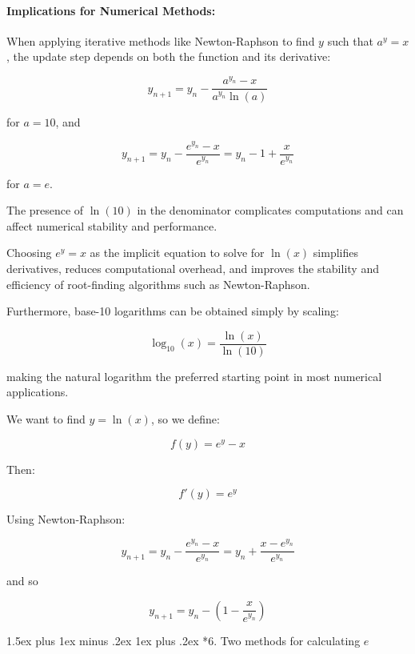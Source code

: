 \documentclass[10pt,twocolumn]{article}
\makeatletter
\renewcommand\section{%
  \@startsection{section}{1}{0pt}%
  {1.5ex plus 1ex minus .2ex}%
  {1ex plus .2ex}%
  {\normalfont\normalsize\bfseries}} %
\makeatother
\begin{document}
\paragraph{Implications for Numerical Methods:}

When applying iterative methods like Newton-Raphson to find \( y \) such that \( a^y = x \), the update step depends on both the function and its derivative:

\[
y_{n+1} = y_n - \frac{a^{y_n} - x}{a^{y_n} \ln(a)}
\]

for \( a = 10 \), and

\begin{equation}
y_{n+1} = y_n - \frac{e^{y_n} - x}{e^{y_n}} = y_n - 1 + \frac{x}{e^{y_n}}
\end{equation}

for \( a = e \).

The presence of \( \ln(10) \) in the denominator complicates computations and can affect numerical stability and performance.

Choosing \( e^y = x \) as the implicit equation to solve for \( \ln(x) \) simplifies derivatives, reduces computational overhead, and improves the stability and efficiency of root-finding algorithms such as Newton-Raphson.

Furthermore, base-10 logarithms can be obtained simply by scaling:

\[
\log_{10}(x) = \frac{\ln(x)}{\ln(10)}
\]

making the natural logarithm the preferred starting point in most numerical applications.

We want to find \( y = \ln(x) \), so we define:

\[
f(y) = e^y - x
\]

Then:

\[
f'(y) = e^y
\]

Using Newton-Raphson:

\begin{equation}
y_{n+1} = y_n - \frac{e^{y_n} - x}{e^{y_n}} = y_n + \frac{x - e^{y_n}}{e^{y_n}}
\end{equation}

and so

\begin{equation}
y_{n+1} = y_n - (1 - \frac{x}{e^{y_n}})
\end{equation}


\section*{6. Two methods for calculating \( e \)}
\end{document}
